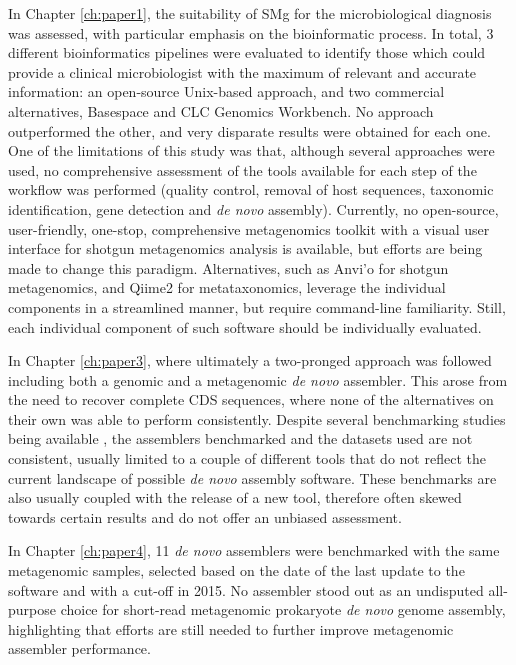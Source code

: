 In Chapter \ref{ch:paper1}, the suitability of \ac{SMg} for the microbiological diagnosis was assessed, with particular emphasis on the bioinformatic process. In total, 3 different bioinformatics pipelines were evaluated to identify those which could provide a clinical microbiologist with the maximum of relevant and accurate information: an open-source Unix-based approach, and two commercial alternatives, Basespace and CLC Genomics Workbench. No approach outperformed the other, and very disparate results were obtained for each one. One of the limitations of this study was that, although several approaches were used, no comprehensive assessment of the tools available for each step of the workflow was performed (quality control, removal of host sequences, taxonomic identification, gene detection and \textit{de novo} assembly). Currently, no open-source, user-friendly, one-stop, comprehensive metagenomics toolkit with a visual user interface for shotgun metagenomics analysis is available, but efforts are being made to change this paradigm. Alternatives, such as Anvi'o \citep{eren_anvio_2015} for shotgun metagenomics, and Qiime2 \citep{bolyen_reproducible_2019} for metataxonomics, leverage the individual components in a streamlined manner, but require command-line familiarity. Still, each individual component of such software should be individually evaluated.

In Chapter \ref{ch:paper3}, where ultimately a two-pronged approach was followed including both a genomic and a metagenomic \textit{de novo} assembler. This arose from the need to recover complete CDS sequences, where none of the alternatives on their own was able to perform consistently. Despite several benchmarking studies being available \citep{miller_assembly_2010, earl_assemblathon_2011, bradnam_assemblathon_2013, liao_current_2019, chen_benchmarking_2020, sczyrba_critical_2017, meyer_critical_2022}, the assemblers benchmarked and the datasets used are not consistent, usually limited to a couple of different tools that do not reflect the current landscape of possible \textit{de novo} assembly software. These benchmarks are also usually coupled with the release of a new tool, therefore often skewed towards certain results and do not offer an unbiased assessment. 

In Chapter \ref{ch:paper4}, 11 \textit{de novo} assemblers were benchmarked with the same metagenomic samples, selected based on the date of the last update to the software and with a cut-off in 2015. No assembler stood out as an undisputed all-purpose choice for short-read metagenomic prokaryote \textit{de novo} genome assembly, highlighting that efforts are still needed to further improve metagenomic assembler performance. 

